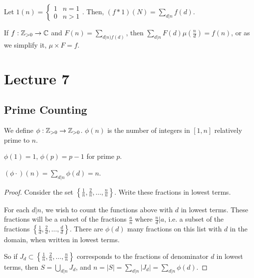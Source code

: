 \documentclass{article}
\begin{document}
\begin{definition}
    Let $1(n) = \begin{cases}1 & n = 1 \\ 0 & n > 1\end{cases}$. Then, $(f * 1)(N) = \sum_{d | n} f(d)$. 
\end{definition}

\begin{theorem}
    If $f : \mathbb Z_{> 0} \to \mathbb C$ and $F(n) = \sum_{d | n) f(d)}$, then $\sum_{d|n} F(d) \mu\left(\frac{n}{d}\right) = f(n)$, or as we simplify it, $\mu \times F = f$.
\end{theorem}

\section{Lecture 7}
\subsection{Prime Counting}
\begin{definition}
    We define $\phi: \mathbb Z_{> 0} \to \mathbb Z_{> 0}$. $\phi(n)$ is the number of integers in $[1, n]$ relatively prime to $n$. 

    $\phi(1) = 1$, $\phi(p) = p-1$ for prime $p$.
\end{definition}

\begin{proposition}
    $(\phi \cdot )(n) = \sum_{d | n} \phi(d) = n$.
\end{proposition}

\begin{proof}
    Consider the set $\left\{\frac{1}{n}, \frac{2}{n}, \ldots, \frac{n}{n}\right\}$. Write these fractions in lowest terms. 
    
    For each $d | n$, we wish to count the functions above with $d$ in lowest terms. These fractions will be a subset of the fractions $\frac{a}{n}$ where $\frac{n}{d} | a$, i.e. a subset of the fractions $\left\{\frac{1}{d}, \frac{2}{d}, \ldots, \frac{d}{d}\right\}$. There are $\phi(d)$ many fractions on this list with $d$ in the domain, when written in lowest terms.

    So if $J_d \subset \left\{\frac{1}{n}, \frac{2}{n}, \ldots, \frac{n}{n}\right\}$ corresponds to the fractions of denominator $d$ in lowest terms, then $S = \bigcup_{d | n} J_d$, and $n = |S| = \sum_{d | n} |J_d| = \sum_{d | n} \phi(d)$. 
\end{proof}
\end{document}
